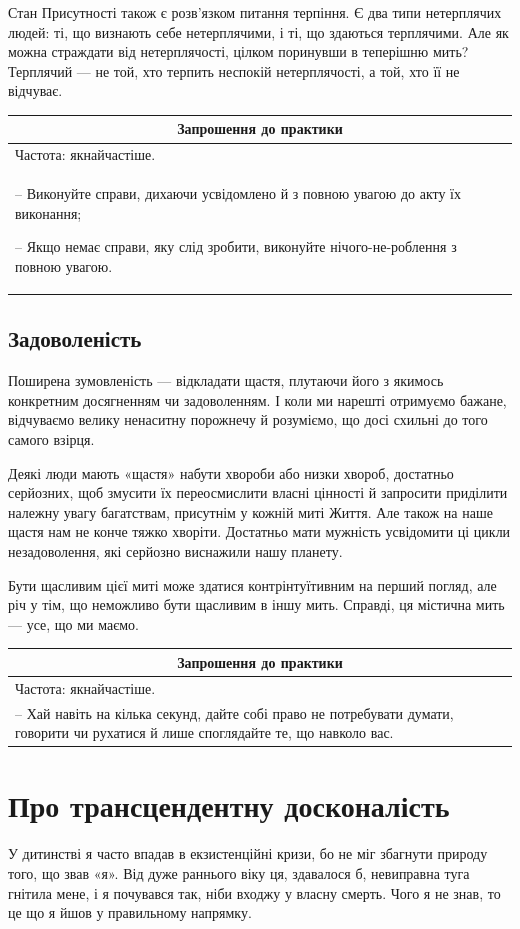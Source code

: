\documentclass[oneside, 12pt]{book}
\newenvironment{prat}[1]
{\begin{center}
\begin{tabular}{p{0.9\textwidth}}
\hline\hline
\multicolumn{1}{c}{Запрошення до практики}\\
\hline
Частота: #1.\\
\hline
}{\\
\hline\hline
\end{tabular} 
\end{center}}
\begin{document}
Стан Присутності також є розв'язком питання терпіння. Є два типи нетерплячих людей: ті, що визнають себе нетерплячими, і ті, що здаються терплячими. Але як можна страждати від нетерплячості, цілком поринувши в теперішню мить? Терплячий --- не той, хто терпить неспокій нетерплячості, а той, хто її не відчуває.

\begin{prat}{якнайчастіше}
-- Виконуйте справи, дихаючи усвідомлено й з повною увагою до акту їх виконання;

-- Якщо немає справи, яку слід зробити, виконуйте нічого-не-роблення з повною увагою.
\end{prat}

\section*{Задоволеність}

Поширена зумовленість --- відкладати щастя, плутаючи його з якимось конкретним досягненням чи задоволенням. І коли ми нарешті отримуємо бажане, відчуваємо велику ненаситну порожнечу й розуміємо, що досі схильні до того самого взірця.

Деякі люди мають «щастя» набути хвороби або низки хвороб, достатньо серйозних, щоб змусити їх переосмислити власні цінності й запросити приділити належну увагу багатствам, присутнім у кожній миті Життя. Але також на наше щастя нам не конче тяжко хворіти. Достатньо мати мужність усвідомити ці цикли незадоволення, які серйозно виснажили нашу планету.

Бути щасливим цієї миті може здатися контрінтуїтивним на перший погляд, але річ у тім, що неможливо бути щасливим в іншу мить. Справді, ця містична мить --- усе, що ми маємо.

\begin{prat}{якнайчастіше}
-- Хай навіть на кілька секунд, дайте собі право не потребувати думати, говорити чи рухатися й лише споглядайте те, що навколо вас.
\end{prat}

\chapter*{Про трансцендентну досконалість}

У дитинстві я часто впадав в екзистенційні кризи, бо не міг збагнути природу того, що звав «я». Від дуже раннього віку ця, здавалося б, невиправна туга гнітила мене, і я почувався так, ніби входжу у власну смерть. Чого я не знав, то це що я йшов у правильному напрямку.
\end{document}
